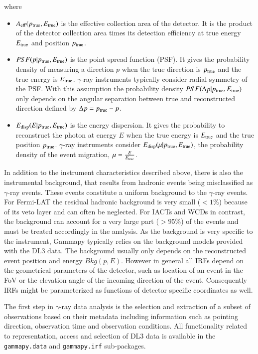 \documentclass[longauth]{aa}
\newcommand{\code}[1]{\texttt{#1}}
\newcommand{\gammapy}{Gammapy\xspace}
\newcommand{\fermi}{Fermi-LAT\xspace}
\newcommand{\gammaray}{$\gamma$-ray\xspace}
\begin{document}
\noindent where
\begin{itemize}
\setlength\itemsep{1em}
\item $A_{\rm eff}(p_{\rm true}, E_{\rm true})$ is the effective collection area of the detector. It is the product
  of the detector collection area times its detection efficiency at true energy $E_{\rm true}$ and position $p_{\rm true}$.
\item $PSF(p|p_{\rm true}, E_{\rm true})$ is the point spread function (PSF). It gives the probability density of
  measuring a direction $p$ when the true direction is $p_{\rm true}$ and the true energy is $E_{\rm true}$.
  \gammaray instruments typically consider radial symmetry of the PSF. With this assumption the probability density 
  $PSF(\Delta p|p_{\rm true}, E_{\rm true})$ only depends on the angular separation between true
 and reconstructed direction defined by $\Delta p = p_{\rm true} - p$.  
\item $E_{\rm disp}(E|p_{\rm true}, E_{\rm true})$ is the energy dispersion. It gives the probability to
  reconstruct the photon at energy $E$ when the true energy is $E_{\rm true}$ and the true position $p_{\rm true}$.
  \gammaray instruments consider $E_{\rm disp}(\mu|p_{\rm true}, E_{\rm true})$, the probability density of the event
  migration, $\mu=\frac{E}{E_{\rm true}}$.
\end{itemize}

In addition to the instrument characteristics described above, there is also the instrumental
background, that results from hadronic events being misclassified as \gammaray events. These
events constitute a uniform background to the \gammaray events. For \fermi the residual hadronic background
is very small ($<1\%$) because of its veto layer and can often be neglected. For IACTs and WCDs in contrast,
the background can account for a very large part ($>95\%$) of the events and must be treated
accordingly in the analysis. As the background is very specific to the instrument, \gammapy typically 
relies on the background models provided with the DL3 data. The background usually only depends
on the reconstructed event position and energy $Bkg(p, E)$. However in general all IRFs depend on the
geometrical parameters of the detector, such as location of an event in the FoV or the elevation
angle of the incoming direction of the event. Consequently IRFs might be parameterized as functions
of detector specific coordinates as well.

The first step in \gammaray data analysis is the selection and extraction of a subset of
observations based on their metadata including information such as pointing direction,
observation time and observation conditions. All functionality related to representation, 
access and selection of DL3 data is available in the \code{gammapy.data} and \code{gammapy.irf}
sub-packages.
\end{document}
